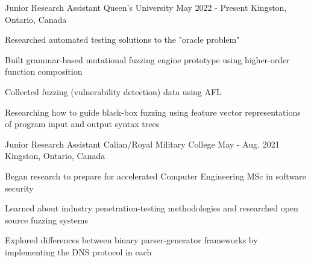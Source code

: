 

\begin{cventries}

  \cventry
    {Junior Research Assistant} %
    {Queen's University} %
    {May 2022 - Present} %
    {Kingston, Ontario, Canada} %
    {
      \begin{cvitems} %
        \item{Researched automated testing solutions to the "oracle problem"}
        \item{Built grammar-based mutational fuzzing engine prototype using higher-order function composition}
        \item{Collected fuzzing (vulnerability detection) data using AFL}
        \item{Researching how to guide black-box fuzzing using feature vector representations of program input and output syntax trees}
      \end{cvitems}
    }

  \cventry
    {Junior Research Assistant} %
    {Calian/Royal Military College} %
    {May - Aug. 2021} %
    {Kingston, Ontario, Canada} %
    {
      \begin{cvitems} %
        \item{Began research to prepare for accelerated Computer Engineering MSc in software security}
        \item{Learned about industry penetration-testing methodologies and researched open source fuzzing systems}
        \item{Explored differences between binary parser-generator frameworks by implementing the DNS protocol in each}
      \end{cvitems}
    }


\end{cventries}
